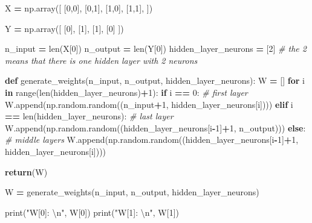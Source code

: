 \documentclass[
]{book}
\newenvironment{Shaded}{\begin{snugshade}}{\end{snugshade}}
\newcommand{\BuiltInTok}[1]{#1}
\newcommand{\CharTok}[1]{\textcolor[rgb]{0.31,0.60,0.02}{#1}}
\newcommand{\CommentTok}[1]{\textcolor[rgb]{0.56,0.35,0.01}{\textit{#1}}}
\newcommand{\ControlFlowTok}[1]{\textcolor[rgb]{0.13,0.29,0.53}{\textbf{#1}}}
\newcommand{\DecValTok}[1]{\textcolor[rgb]{0.00,0.00,0.81}{#1}}
\newcommand{\KeywordTok}[1]{\textcolor[rgb]{0.13,0.29,0.53}{\textbf{#1}}}
\newcommand{\NormalTok}[1]{#1}
\newcommand{\OperatorTok}[1]{\textcolor[rgb]{0.81,0.36,0.00}{\textbf{#1}}}
\newcommand{\StringTok}[1]{\textcolor[rgb]{0.31,0.60,0.02}{#1}}
\begin{document}
\begin{Shaded}
\begin{Highlighting}[]
\NormalTok{X }\OperatorTok{=}\NormalTok{ np.array([}
\NormalTok{  [}\DecValTok{0}\NormalTok{,}\DecValTok{0}\NormalTok{],}
\NormalTok{  [}\DecValTok{0}\NormalTok{,}\DecValTok{1}\NormalTok{],}
\NormalTok{  [}\DecValTok{1}\NormalTok{,}\DecValTok{0}\NormalTok{],}
\NormalTok{  [}\DecValTok{1}\NormalTok{,}\DecValTok{1}\NormalTok{],}
\NormalTok{]) }

\NormalTok{Y }\OperatorTok{=}\NormalTok{ np.array([}
\NormalTok{  [}\DecValTok{0}\NormalTok{],}
\NormalTok{  [}\DecValTok{1}\NormalTok{],}
\NormalTok{  [}\DecValTok{1}\NormalTok{],}
\NormalTok{  [}\DecValTok{0}\NormalTok{]}
\NormalTok{])}

\NormalTok{n\_input }\OperatorTok{=} \BuiltInTok{len}\NormalTok{(X[}\DecValTok{0}\NormalTok{])}
\NormalTok{n\_output }\OperatorTok{=} \BuiltInTok{len}\NormalTok{(Y[}\DecValTok{0}\NormalTok{])}
\NormalTok{hidden\_layer\_neurons }\OperatorTok{=}\NormalTok{ [}\DecValTok{2}\NormalTok{] }\CommentTok{\# the 2 means that there is one hidden layer with 2 neurons}

\KeywordTok{def}\NormalTok{ generate\_weights(n\_input, n\_output, hidden\_layer\_neurons):}
\NormalTok{  W }\OperatorTok{=}\NormalTok{ []}
  \ControlFlowTok{for}\NormalTok{ i }\KeywordTok{in} \BuiltInTok{range}\NormalTok{(}\BuiltInTok{len}\NormalTok{(hidden\_layer\_neurons)}\OperatorTok{+}\DecValTok{1}\NormalTok{):}
    \ControlFlowTok{if}\NormalTok{ i }\OperatorTok{==} \DecValTok{0}\NormalTok{: }\CommentTok{\# first layer}
\NormalTok{      W.append(np.random.random((n\_input}\OperatorTok{+}\DecValTok{1}\NormalTok{, hidden\_layer\_neurons[i])))}
    \ControlFlowTok{elif}\NormalTok{ i }\OperatorTok{==} \BuiltInTok{len}\NormalTok{(hidden\_layer\_neurons): }\CommentTok{\# last layer}
\NormalTok{      W.append(np.random.random((hidden\_layer\_neurons[i}\OperatorTok{{-}}\DecValTok{1}\NormalTok{]}\OperatorTok{+}\DecValTok{1}\NormalTok{, n\_output)))}
    \ControlFlowTok{else}\NormalTok{: }\CommentTok{\# middle layers}
\NormalTok{      W.append(np.random.random((hidden\_layer\_neurons[i}\OperatorTok{{-}}\DecValTok{1}\NormalTok{]}\OperatorTok{+}\DecValTok{1}\NormalTok{, hidden\_layer\_neurons[i])))}
   
  \ControlFlowTok{return}\NormalTok{(W)}

\NormalTok{W }\OperatorTok{=}\NormalTok{ generate\_weights(n\_input, n\_output, hidden\_layer\_neurons)}

\BuiltInTok{print}\NormalTok{(}\StringTok{"W[0]: }\CharTok{\textbackslash{}n}\StringTok{"}\NormalTok{, W[}\DecValTok{0}\NormalTok{])}
\BuiltInTok{print}\NormalTok{(}\StringTok{"W[1]: }\CharTok{\textbackslash{}n}\StringTok{"}\NormalTok{, W[}\DecValTok{1}\NormalTok{])}
\end{Highlighting}
\end{Shaded}
\end{document}
